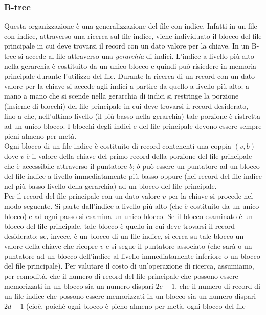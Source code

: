 \subsubsection{B-tree}
Questa organizzazione è una generalizzazione del file con indice. Infatti in un file con indice,
attraverso una ricerca sul file indice, viene individuato il blocco del file principale in cui deve
trovarsi il record con un dato valore per la chiave. In un B-tree si accede al file attraverso una
\emph{gerarchia} di indici. L’indice a livello più alto nella gerarchia è costituito da un unico blocco e quindi
può risiedere in memoria principale durante l’utilizzo del file. Durante la ricerca di un record con un
dato valore per la chiave si accede agli indici a partire da quello a livello più alto; a mano a mano
che si scende nella gerarchia di indici si restringe la porzione (insieme di blocchi) del file principale
in cui deve trovarsi il record desiderato, fino a che, nell’ultimo livello (il più basso nella gerarchia)
tale porzione è ristretta ad un unico blocco. I blocchi degli indici e del file principale devono essere
sempre pieni almeno per metà.\\
Ogni blocco di un file indice è costituito di record contenenti una coppia $(v, b)$ dove $v$ è il valore
della chiave del primo record della porzione del file principale che è accessibile attraverso il
puntatore $b$; $b$ può essere un puntatore ad un blocco del file indice a livello immediatamente più
basso oppure (nei record del file indice nel più basso livello della gerarchia) ad un blocco del file
principale.\\
Per  il record del file principale con un dato valore $v$ per la chiave si procede nel modo
seguente. Si parte dall’indice a livello più alto (che è costituito da un unico blocco) e ad ogni passo
si esamina un unico blocco. Se il blocco esaminato è un blocco del file principale, tale blocco è
quello in cui deve trovarsi il record desiderato; se, invece, è un blocco di un file indice, si cerca su
tale blocco un valore della chiave che ricopre $v$ e si segue il puntatore associato (che sarà o un
puntatore ad un blocco dell’indice al livello immediatamente inferiore o un blocco del file
principale). Per valutare il costo di un’operazione di ricerca, assumiamo, per comodità, che il
numero di record del file principale che possono essere memorizzati in un blocco sia un numero
dispari $2e-1$, che il numero di record di un file indice che possono essere memorizzati in un blocco
sia un numero dispari $2d-1$ (cioè, poiché ogni blocco è pieno almeno per metà, ogni blocco del file
